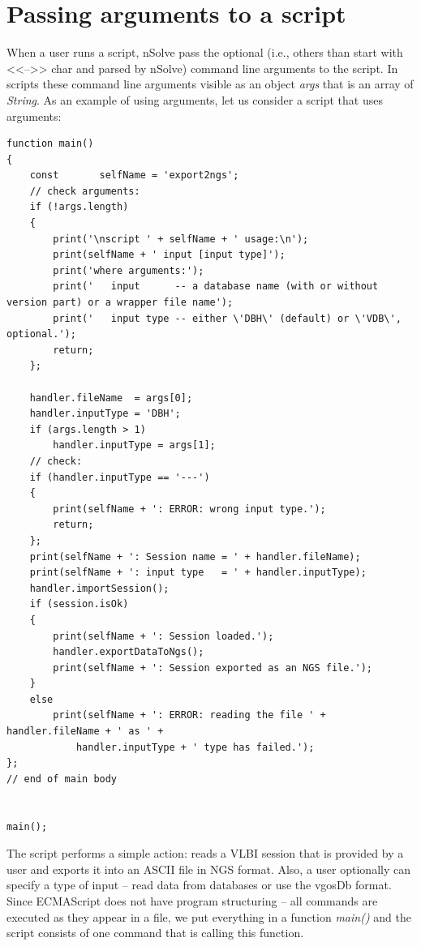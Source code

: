 \documentclass [10pt,letterpaper]{report}
\newcommand{\nuSolve}{\greektext n\latintext Solve}
\begin{document}
{{%
\section{Passing arguments to a script}
\label{section-scripting-args}

When a user runs a script, \nuSolve{} pass the optional (i.e., others than start
with <<-->> char and parsed by \nuSolve{}) command line arguments to the script.
In scripts these command line arguments visible as an object {\sl args} that is
an array of {\sl String}. As an example of using arguments, let us consider a
script that uses arguments:
{\small\begin{verbatim}
function main()
{
    const       selfName = 'export2ngs';
    // check arguments:
    if (!args.length)
    {
        print('\nscript ' + selfName + ' usage:\n');
        print(selfName + ' input [input type]');
        print('where arguments:');
        print('   input      -- a database name (with or without version part) or a wrapper file name');
        print('   input type -- either \'DBH\' (default) or \'VDB\', optional.');
        return;
    };

    handler.fileName  = args[0];
    handler.inputType = 'DBH';
    if (args.length > 1)
        handler.inputType = args[1];
    // check:
    if (handler.inputType == '---')
    {
        print(selfName + ': ERROR: wrong input type.');
        return;
    };
    print(selfName + ': Session name = ' + handler.fileName);
    print(selfName + ': input type   = ' + handler.inputType);
    handler.importSession();
    if (session.isOk)
    {
        print(selfName + ': Session loaded.');
        handler.exportDataToNgs();
        print(selfName + ': Session exported as an NGS file.');
    }
    else
        print(selfName + ': ERROR: reading the file ' + handler.fileName + ' as ' +
            handler.inputType + ' type has failed.');
};
// end of main body


main();
\end{verbatim}}
\noindent
The script performs a simple action: reads a VLBI session that is provided by a user
and exports it into an ASCII file in NGS format. Also, a user optionally can specify
a type of input -- read data from databases or use the vgosDb format. Since ECMAScript
does not have program structuring -- all commands are executed as they appear in a file,
we put everything in a function {\sl main()} and the script consists of one command that
is calling this function.

}}
\end{document}
